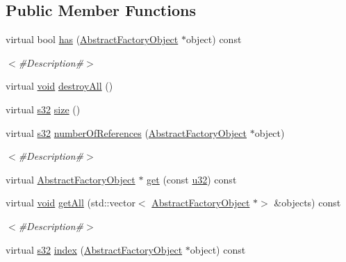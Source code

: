\subsection*{Public Member Functions}
\begin{DoxyCompactItemize}
\item 
virtual bool \mbox{\hyperlink{classnjli_1_1_world_factory_a5ba361b0dc1aff668f113172667981c4}{has}} (\mbox{\hyperlink{classnjli_1_1_abstract_factory_object}{Abstract\+Factory\+Object}} $\ast$object) const
\begin{DoxyCompactList}\small\item\em $<$\#\+Description\#$>$ \end{DoxyCompactList}\item 
virtual \mbox{\hyperlink{_thread_8h_af1e856da2e658414cb2456cb6f7ebc66}{void}} \mbox{\hyperlink{classnjli_1_1_world_factory_a2ab6116ee5ff90d27f7661c6e211620a}{destroy\+All}} ()
\item 
virtual \mbox{\hyperlink{_util_8h_aa62c75d314a0d1f37f79c4b73b2292e2}{s32}} \mbox{\hyperlink{classnjli_1_1_world_factory_ad5d3fc4509c0939fd64f5d8473e915d2}{size}} ()
\item 
virtual \mbox{\hyperlink{_util_8h_aa62c75d314a0d1f37f79c4b73b2292e2}{s32}} \mbox{\hyperlink{classnjli_1_1_world_factory_aad74e165dafe9781f2578dc3d29a1d07}{number\+Of\+References}} (\mbox{\hyperlink{classnjli_1_1_abstract_factory_object}{Abstract\+Factory\+Object}} $\ast$object)
\begin{DoxyCompactList}\small\item\em $<$\#\+Description\#$>$ \end{DoxyCompactList}\item 
virtual \mbox{\hyperlink{classnjli_1_1_abstract_factory_object}{Abstract\+Factory\+Object}} $\ast$ \mbox{\hyperlink{classnjli_1_1_world_factory_a8f9aeb468fce2ee2c0c4adf50824db1a}{get}} (const \mbox{\hyperlink{_util_8h_a10e94b422ef0c20dcdec20d31a1f5049}{u32}}) const
\item 
virtual \mbox{\hyperlink{_thread_8h_af1e856da2e658414cb2456cb6f7ebc66}{void}} \mbox{\hyperlink{classnjli_1_1_world_factory_af184be71213aee7dc980e6088b498c79}{get\+All}} (std\+::vector$<$ \mbox{\hyperlink{classnjli_1_1_abstract_factory_object}{Abstract\+Factory\+Object}} $\ast$$>$ \&objects) const
\begin{DoxyCompactList}\small\item\em $<$\#\+Description\#$>$ \end{DoxyCompactList}\item 
virtual \mbox{\hyperlink{_util_8h_aa62c75d314a0d1f37f79c4b73b2292e2}{s32}} \mbox{\hyperlink{classnjli_1_1_world_factory_abfb139b97c6ed43ae5f25c80cc1fdf94}{index}} (\mbox{\hyperlink{classnjli_1_1_abstract_factory_object}{Abstract\+Factory\+Object}} $\ast$object) const
$$
\end{DoxyCompactItemize}
